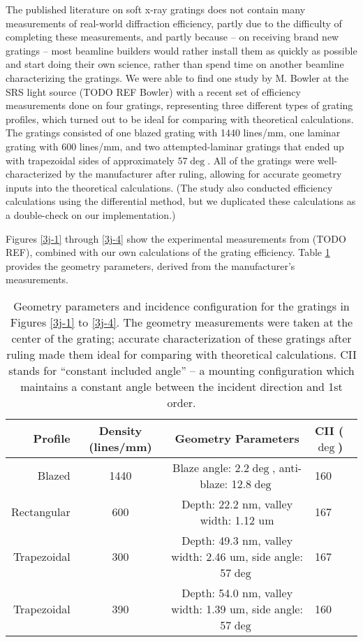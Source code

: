 The published literature on soft x-ray gratings does not contain many measurements of real-world diffraction efficiency, partly due to the difficulty of completing these measurements, and partly because -- on receiving brand new gratings -- most beamline builders would rather install them as quickly as possible and start doing their own science, rather than spend time on another beamline characterizing the gratings.  We were able to find one study by M. Bowler at the SRS light source (TODO REF Bowler) with a recent set of efficiency measurements done on four gratings, representing three different types of grating profiles, which turned out to be ideal for comparing with theoretical calculations.  The gratings consisted of one blazed grating with 1440 lines/mm, one laminar grating with 600 lines/mm, and two attempted-laminar gratings that ended up with trapezoidal sides of approximately $57\deg$.  All of the gratings were well-characterized by the manufacturer after ruling, allowing for accurate geometry inputs into the theoretical calculations.  (The study also conducted efficiency calculations  using the differential method, but we duplicated these calculations as a double-check on our implementation.)

Figures \ref{3j-1} through \ref{3j-4} show the experimental measurements from (TODO REF), combined with our own calculations of the grating efficiency.  Table \ref{3j-table} provides the geometry parameters, derived from the manufacturer's measurements.

\begin{table}[htbp]
   \centering
   \caption{Geometry parameters and incidence configuration for the gratings in Figures \ref{3j-1} to \ref{3j-4}.  The geometry measurements were taken at the center of the grating; accurate characterization of these gratings after ruling made them ideal for comparing with theoretical calculations. CII stands for ``constant included angle'' -- a mounting configuration which maintains a constant angle between the incident direction and 1st order.}
   \begin{tabular}{@{} r c c l @{}} %
      \hline
        Profile    &  Density (lines/mm)& Geometry Parameters & CII ($\deg$)\\
      \hline \hline
Blazed & 1440 & Blaze angle: 2.2$\deg$, anti-blaze: 12.8$\deg$ & 160 \\
Rectangular & 600 & Depth: 22.2 nm, valley width: 1.12 um & 167 \\
Trapezoidal & 300 & Depth: 49.3 nm, valley width: 2.46 um, side angle: 57$\deg$ & 167\\
Trapezoidal & 390 & Depth: 54.0 nm, valley width: 1.39 um, side angle: 57$\deg$ & 160\\
\hline
   \end{tabular}
   \label{3j-table}
\end{table}

